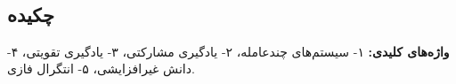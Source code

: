 
\setcounter{page}{1}
\thispagestyle{empty}

~\vfill

\subsection*{چکیده}
\begin{small}
\baselineskip=0.7cm
\vspace*{0.5 cm}

\noindent\textbf{واژه‌های کلیدی:}
۱- سیستم‌های چندعامله، ۲- یادگیری مشارکتی، ۳- یادگیری تقویتی، ۴- دانش غیرافزایشی، ۵- انتگرال فازی.
\end{small}